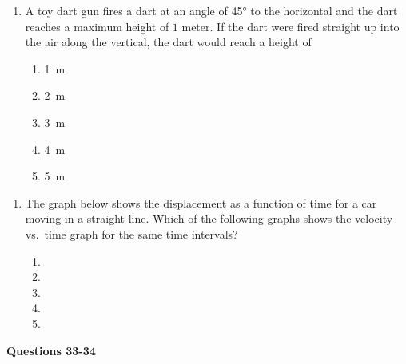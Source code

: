 \documentclass{../../oss-apphys}
\begin{document}
\begin{multicols}{2}
\begin{enumerate}[resume,leftmargin=18pt]
    \item A toy dart gun fires a dart at an angle of \ang{45} to the horizontal
      and the dart reaches a maximum height of $1$ meter. If the dart were fired
      straight up into the air along the vertical, the dart would reach a height
      of
      \begin{enumerate}[noitemsep,topsep=0pt,leftmargin=18pt,label=(\Alph*)]
      \item\SI{1}{\metre}
      \item\SI{2}{\metre}
      \item\SI{3}{\metre}
      \item\SI{4}{\metre}
      \item\SI{5}{\metre}
      \end{enumerate}
  \end{enumerate}
  
  \begin{enumerate}[resume,leftmargin=18pt]
    
  \item The graph below shows the displacement as a function of time for a
    car moving in a straight line. Which of the following graphs shows the
    velocity vs.\ time graph for the same time intervals?
    \begin{enumerate}[noitemsep,topsep=0pt,leftmargin=18pt,label=(\Alph*)]
    \item
    \item
    \item
    \item
    \item
    \end{enumerate}
  \end{enumerate}

  \textbf{Questions 33-34}
  

\end{multicols}
\end{document}
